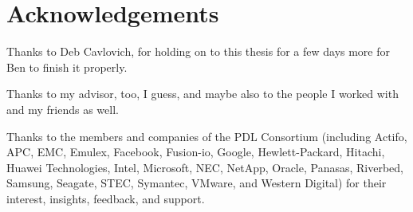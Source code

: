 \chapter*{Acknowledgements}

Thanks to Deb Cavlovich, for holding on to this thesis for a few days more for Ben to finish it properly.

Thanks to my advisor, too, I guess, and maybe also to the people I worked with and my friends as well.

Thanks to the members and companies of the PDL Consortium (including Actifo,
APC, EMC, Emulex, Facebook, Fusion-io, Google, Hewlett-Packard, Hitachi, Huawei
Technologies, Intel, Microsoft, NEC, NetApp, Oracle, Panasas, Riverbed,
Samsung, Seagate, STEC, Symantec, VMware, and Western Digital) for their
interest, insights, feedback, and support.
